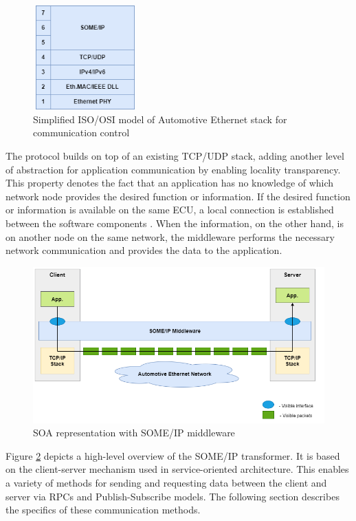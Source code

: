 \begin{figure}[!htb]
	\centering
		\includegraphics[width=4cm, height=4cm,keepaspectratio]{images/iso_osi_someip.png}
	\caption{Simplified ISO/OSI model of Automotive Ethernet stack for communication control}
	\label{fig:ISO_OSI_Model}
\end{figure}

The protocol builds on top of an existing TCP/UDP stack, adding another level of abstraction for application communication by enabling locality transparency. This property denotes the fact that an application has no knowledge of which network node provides the desired function or information. If the desired function or information is available on the same ECU, a local connection is established between the software components \cite{b1.4}. When the information, on the other hand, is on another node on the same network, the middleware performs the necessary network communication and provides the data to the application.

\begin{figure}[!htb]
	\centering
		\includegraphics[width=1\textwidth]{images/SOMEIP_Middleware.png}
	\caption{SOA representation with SOME/IP middleware}
	\label{fig:SOMEIP_Middleware}
\end{figure}

Figure \ref{fig:SOMEIP_Middleware} depicts a high-level overview of the SOME/IP transformer. It is based on the client-server mechanism used in service-oriented architecture. This enables a variety of methods for sending and requesting data between the client and server via RPCs and Publish-Subscribe models. The following section describes the specifics of these communication methods.

